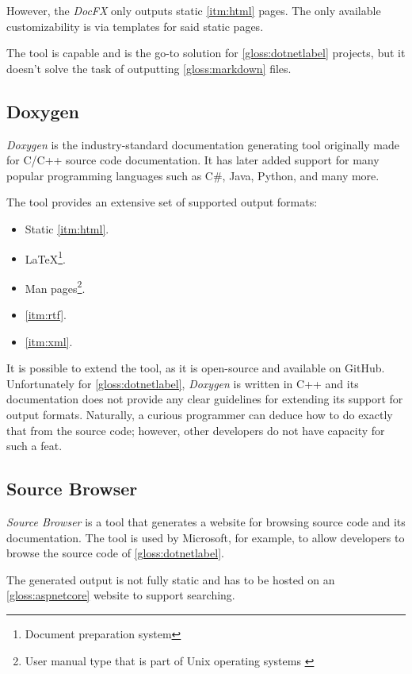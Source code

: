 However, the \textit{DocFX} only outputs static \ref{itm:html} pages. The only available customizability is via templates for said static pages.

The tool is capable and is the go-to solution for \ref{gloss:dotnetlabel} projects, but it doesn't solve the task of outputting \ref{gloss:markdown} files.

\subsection{Doxygen} \label{sec:doxygen}

\textit{Doxygen} is the industry-standard documentation generating tool originally made for C/C++ source code documentation. It has later added support for many popular programming languages such as C\#, Java, Python, and many more.

The tool provides an extensive set of supported output formats:
\begin{itemize}
    \item Static \ref{itm:html}.
    \item \LaTeX\footnote{Document preparation system}.
    \item Man pages\footnote{User manual type that is part of Unix operating systems \cite{credocs_limited_latex_2022}}.
    \item \ref{itm:rtf}.
    \item \ref{itm:xml}.
\end{itemize}

It is possible to extend the tool, as it is open-source and available on GitHub. Unfortunately for \ref{gloss:dotnetlabel}, \textit{Doxygen} is written in C++ and its documentation does not provide any clear guidelines for extending its support for output formats. Naturally, a curious programmer can deduce how to do exactly that from the source code; however, other developers do not have capacity for such a feat.

\subsection{Source Browser}

\textit{Source Browser} is a tool that generates a website for browsing source code and its documentation. The tool is used by Microsoft, for example, to allow developers to browse the source code of \ref{gloss:dotnetlabel}.

The generated output is not fully static and has to be hosted on an \ref{gloss:aspnetcore} website to support searching.

